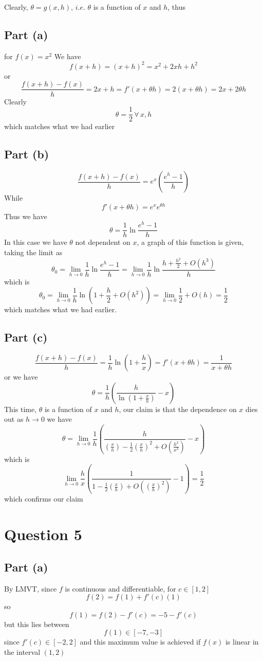 \documentclass[12pt]{article}
\begin{document}
Clearly, $\theta = g(x,h)$, $i$.$e$. $\theta$ is a function of $x$ and $h$, thus

\subsection{Part (a)}
for $f(x) = x^2$
We have
$$
f(x + h) = (x+h)^{2} = x^{2} + 2xh + h^{2}
$$
or 
$$
\frac{f(x + h)-f(x)}{h} = 2x + h = f'(x + \theta h) = 2(x + \theta h) = 2x + 2\theta h
$$
Clearly
$$
\theta = \frac{1}{2} \, \forall \,x, h
$$
which matches what we had earlier
\subsection{Part (b)}
$$
\frac{f(x + h)-f(x)}{h} = e^{ x }\left(  \frac{e^{ h }-1}{h} \right)
$$
While
$$
f'(x + \theta h) = e^{ x }e^{ \theta h }
$$
Thus we have
$$
\theta = \frac{1}{h} \ln \frac{e^{ h }-1}{h}
$$
In this case we have $\theta$ not dependent on $x$, a graph of this function is given, taking the limit as
$$
\theta_{0} = \lim_{ h \to 0 } \frac{1}{h} \ln \frac{e^{ h }-1}{h} = \lim_{ h \to 0 } \frac{1}{h}\ln \frac{h + \frac{h^{2}}{2} +O(h^{3})}{h}
$$
which is
$$
\theta_{0} = \lim_{ h \to 0 }\frac{1}{h} \ln \left( 1 + \frac{h}{2} + O(h^{2}) \right) = \lim_{ h \to 0 } \frac{1}{2} + O(h)  = \frac{1}{2}
$$
which matches what we had earlier.

\subsection{Part (c)}
$$
\frac{f(x+h)-f(x)}{h} = \frac{1}{h}\ln \left( 1 + \frac{h}{x}\right) = f'(x + \theta h) = \frac{1}{x + \theta h}
$$
or we have
$$
\theta = \frac{1}{h}\left( \frac{h}{\ln \left( 1 + \frac{x}{h} \right)}-x \right)
$$
This time, $\theta$ is a function of $x$ and $h$, our claim is that the dependence on $x$ dies out as $h \to 0$ we have
$$
\theta = \lim_{ h \to 0 } \frac{1}{h}\left( \frac{h}{\left( \frac{x}{h}  \right)-\frac{1}{2}\left( \frac{x}{h} \right)^{2} +O\left( \frac{h^{3}}{x^{3}} \right)}  -x\right)
$$
which is
$$
\lim_{ h \to 0 } \frac{h}{x}\left( \frac{1}{1-\frac{1}{2}\left( \frac{x}{h} \right)+O\left( \left( \frac{x}{h} \right)^{2} \right)}-1 \right) = \frac{1}{2}
$$
which confirms our claim

\section{Question 5}
\subsection{Part (a)}
By LMVT, since $f$ is continuous and differentiable, for $c \in [1,2]$
$$
f(2) = f(1) + f'(c)(1)
$$
so
$$
f(1) = f(2) - f'(c) = -5 -f'(c)
$$
but this lies between
$$
f(1) \in [-7,-3]
$$
since $f'(c) \in [-2,2]$ and this maximum value is achieved if $f(x)$ is linear in the interval $(1,2)$
\end{document}

